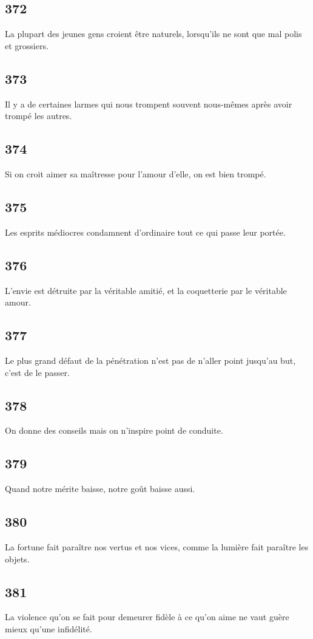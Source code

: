 \documentclass[french,twoside]{book} %
\begin{document}
\subsection[{372}]{ \textsc{372} }
\noindent La plupart des jeunes gens croient être naturels, lorsqu’ils ne sont que mal polis et grossiers.
\subsection[{373}]{ \textsc{373} }
\noindent Il y a de certaines larmes qui nous trompent souvent nous-mêmes après avoir trompé les autres.
\subsection[{374}]{ \textsc{374} }
\noindent Si on croit aimer sa maîtresse pour l’amour d’elle, on est bien trompé.
\subsection[{375}]{ \textsc{375} }
\noindent Les esprits médiocres condamnent d’ordinaire tout ce qui passe leur portée.
\subsection[{376}]{ \textsc{376} }
\noindent L’envie est détruite par la véritable amitié, et la coquetterie par le véritable amour.
\subsection[{377}]{ \textsc{377} }
\noindent Le plus grand défaut de la pénétration n’est pas de n’aller point jusqu’au but, c’est de le passer.
\subsection[{378}]{ \textsc{378} }
\noindent On donne des conseils mais on n’inspire point de conduite.
\subsection[{379}]{ \textsc{379} }
\noindent Quand notre mérite baisse, notre goût baisse aussi.
\subsection[{380}]{ \textsc{380} }
\noindent La fortune fait paraître nos vertus et nos vices, comme la lumière fait paraître les objets.
\subsection[{381}]{ \textsc{381} }
\noindent La violence qu’on se fait pour demeurer fidèle à ce qu’on aime ne vaut guère mieux qu’une infidélité.
\end{document}
